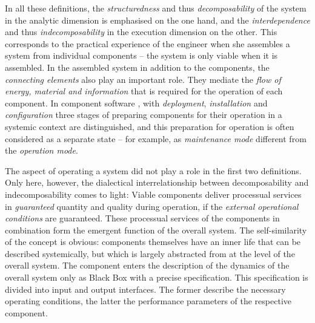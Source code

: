 \documentclass[11pt,a4paper]{article}
\begin{document}
In all these definitions, the \emph{structuredness} and thus
\emph{decomposability} of the system in the analytic dimension is emphasised
on the one hand, and the \emph{interdependence} and thus
\emph{indecomposability} in the execution dimension on the other. This
corresponds to the practical experience of the engineer when she assembles a
system from individual components -- the system is only viable when it is
assembled. In the assembled system in addition to the components, the
\emph{connecting elements} also play an important role.  They mediate the
\emph{flow of energy, material and information} that is required for the
operation of each component. In component software \cite{Szyperski2002}, with
\emph{deployment}, \emph{installation} and \emph{configuration} three stages
of preparing components for their operation in a systemic context are
distinguished, and this preparation for operation is often considered as a
separate state -- for example, as \emph{maintenance mode} different from the
\emph{operation mode}.

The aspect of operating a system did not play a role in the first two
definitions.  Only here, however, the dialectical interrelationship between
decomposability and indecomposability comes to light: Viable components
deliver processual services in \emph{guaranteed} quantity and quality during
operation, if the \emph{external operational conditions} are guaranteed.
These processual services of the components in combination form the emergent
function of the overall system. The self-similarity of the concept is obvious:
components themselves have an inner life that can be described systemically,
but which is largely abstracted from at the level of the overall system. The
component enters the description of the dynamics of the overall system only as
Black Box with a precise specification.  This specification is divided into
input and output interfaces.  The former describe the necessary operating
conditions, the latter the performance parameters of the respective component.
\end{document}
